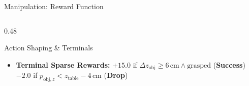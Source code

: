 \documentclass[10pt]{beamer}
\begin{document}
\begin{frame}{Manipulation: Reward Function}
\begin{columns}[T]
\begin{column}{0.48\textwidth}
\begin{block}{Action Shaping \& Terminals}
\begin{itemize}
$$\begin{cases}
                        -0.25 & \text{if } d < 4\,\text{cm} \land a_g \le 0 \\
                        -0.2 & \text{if } d \ge 4\,\text{cm} \land a_g > 0.2 \\
                        0 & \text{otherwise}
                    \end{cases}$$
                    \textit{Prevents premature closure before alignment.}
                    \item \textbf{Terminal Sparse Rewards:}
                    \newline $+15.0$ if $\Delta z_{\text{obj}} \ge 6\,\text{cm} \land \text{grasped}$ (\textbf{Success})
                    \newline $-2.0$ if $p_{\text{obj}, z} < z_{\text{table}} - 4\,\text{cm}$ (\textbf{Drop})
                \end{itemize}
            \end{block}
        \end{column}
    \end{columns}
\end{frame}
\end{document}
